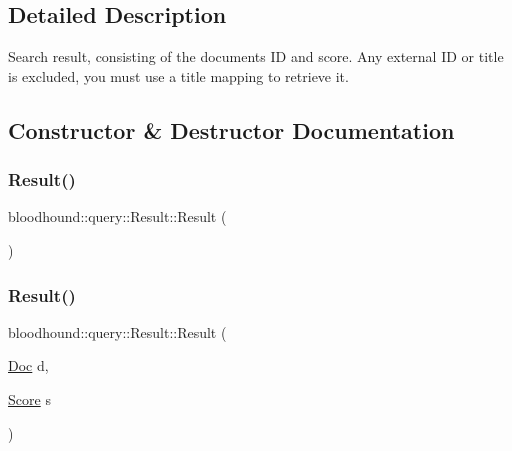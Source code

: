 \subsection{Detailed Description}
Search result, consisting of the document\textquotesingle{}s ID and score. Any external ID or title is excluded, you must use a title mapping to retrieve it. 

\subsection{Constructor \& Destructor Documentation}
\mbox{\label{structbloodhound_1_1query_1_1Result_a6a9aaa804dbe3929b653b614e18408e1}} 
\subsubsection{\texorpdfstring{Result()}{Result()}\hspace{0.1cm}{\footnotesize\ttfamily [1/2]}}
{\footnotesize\ttfamily bloodhound\+::query\+::\+Result\+::\+Result (\begin{DoxyParamCaption}{ }\end{DoxyParamCaption})\hspace{0.3cm}{\ttfamily [default]}}

\mbox{\label{structbloodhound_1_1query_1_1Result_ac4c15cb4d9e60b3e7bf37bd813215f55}} 
\subsubsection{\texorpdfstring{Result()}{Result()}\hspace{0.1cm}{\footnotesize\ttfamily [2/2]}}
{\footnotesize\ttfamily bloodhound\+::query\+::\+Result\+::\+Result (\begin{DoxyParamCaption}\item[{\hyperlink{structbloodhound_1_1Doc}{Doc}}]{d,  }\item[{\hyperlink{structbloodhound_1_1Score}{Score}}]{s }\end{DoxyParamCaption})\hspace{0.3cm}{\ttfamily [inline]}}



